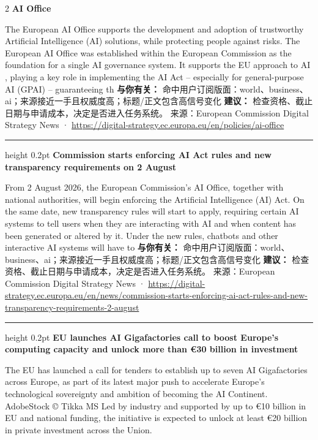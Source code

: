 \documentclass[10.5pt]{ctexart}
\begin{document}
\begin{multicols}{2}
{\large\bfseries AI Office}\par
The European AI Office supports the development and adoption of trustworthy Artificial Intelligence (AI) solutions, while protecting people against risks. The European AI Office was established within the European Commission as the foundation for a single AI governance system. It supports the EU approach to AI , playing a key role in implementing the AI Act – especially for general-purpose AI (GPAI) – guaranteeing th
\textbf{与你有关：} 命中用户订阅版面：world、business、ai；来源接近一手且权威度高；标题/正文包含高信号变化
\textbf{建议：} 检查资格、截止日期与申请成本，决定是否进入任务系统。
{\footnotesize\color{ormuted} 来源：European Commission Digital Strategy News · \url{https://digital-strategy.ec.europa.eu/en/policies/ai-office}}
\vspace{2mm}
\hrule height 0.2pt
\vspace{2mm}
{\large\bfseries Commission starts enforcing AI Act rules and new transparency requirements on 2 August}\par
From 2 August 2026, the European Commission’s AI Office, together with national authorities, will begin enforcing the Artificial Intelligence (AI) Act. On the same date, new transparency rules will start to apply, requiring certain AI systems to tell users when they are interacting with AI and when content has been generated or altered by it. Under the new rules, chatbots and other interactive AI systems will have to
\textbf{与你有关：} 命中用户订阅版面：world、business、ai；来源接近一手且权威度高；标题/正文包含高信号变化
\textbf{建议：} 检查资格、截止日期与申请成本，决定是否进入任务系统。
{\footnotesize\color{ormuted} 来源：European Commission Digital Strategy News · \url{https://digital-strategy.ec.europa.eu/en/news/commission-starts-enforcing-ai-act-rules-and-new-transparency-requirements-2-august}}
\vspace{2mm}
\hrule height 0.2pt
\vspace{2mm}
{\large\bfseries EU launches AI Gigafactories call to boost Europe's computing capacity and unlock more than €30 billion in investment}\par
The EU has launched a call for tenders to establish up to seven AI Gigafactories across Europe, as part of its latest major push to accelerate Europe's technological sovereignty and ambition of becoming the AI Continent. AdobeStock © Tikka MS Led by industry and supported by up to €10 billion in EU and national funding, the initiative is expected to unlock at least €20 billion in private investment across the Union. 

\end{multicols}
\end{document}
